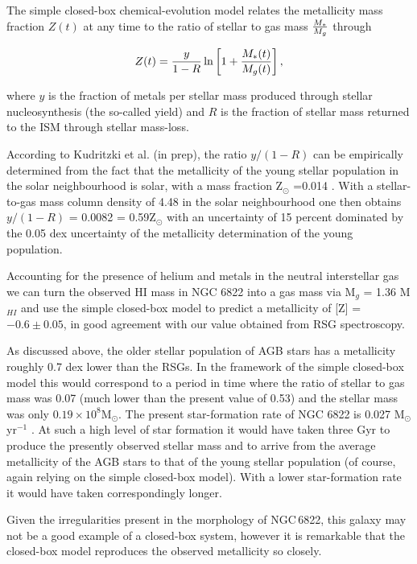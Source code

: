 \documentclass[iop]{emulateapj}
\begin{document}
The simple closed-box chemical-evolution model relates the metallicity mass fraction $Z(t)$ at any time to the ratio of stellar to gas mass $M_{*}\over M_{g}$ through

\begin{equation}\label{closed-box}
Z(t) = {y \over 1-R } \ln \left[ 1 + {M_{*}(t)\over M_{g}(t)}  \right],
\end{equation}

where $y$ is the fraction of metals per stellar mass produced through stellar nucleosynthesis
(the so-called yield) and $R$ is the fraction of stellar mass returned to the ISM through stellar mass-loss.

According to
Kudritzki et al. (in prep), the ratio $y/(1-R)$ can be empirically determined from the fact that the metallicity of the young stellar population in the solar neighbourhood is solar, with a mass fraction Z$_{\odot}$ =0.014
\citep{2012A&A...539A.143N}.
With a stellar-to-gas mass column density of 4.48 in the solar neighbourhood
\citep{2003ApJ...587..278W,2013ApJ...779..115B}
one then obtains $y/(1-R)$ = 0.0082 = 0.59Z$_{\odot}$ with an uncertainty of 15 percent dominated by the 0.05 dex uncertainty of the metallicity determination of the young population.

Accounting for the presence of helium and metals in the neutral interstellar gas we can turn the observed HI mass in NGC 6822 into a gas mass via
M$_{g}$ = 1.36 M$_{HI}$ and use the simple closed-box model to predict a metallicity of
[Z] = $-0.6\pm0.05$,
in good agreement with our value obtained from RSG spectroscopy.

As discussed above, the older stellar population of AGB stars has a metallicity roughly 0.7 dex lower than the RSGs. In the framework of the simple closed-box model this would correspond to a period in time where the ratio of stellar to gas mass was 0.07
(much lower than the present value of 0.53) and the stellar mass was only
$0.19\times10^{8}$M$_{\odot}$.
The present star-formation rate of NGC 6822 is 0.027 M$_{\odot}$yr$^{-1}$
\citep{1996A&A...308..723I,2006ApJ...652.1170C,2010A&A...512A..68G}.
At such a high level of star formation it would have taken three Gyr to produce the presently observed stellar mass and to arrive from the average metallicity of the AGB stars to that of the young stellar population
(of course, again relying on the simple closed-box model).
With a lower star-formation rate it would have taken correspondingly longer.

Given the irregularities present in the morphology of NGC\,6822, this galaxy may not be a good example of a closed-box system, however it is remarkable that the closed-box model reproduces the observed metallicity so closely.
\end{document}
